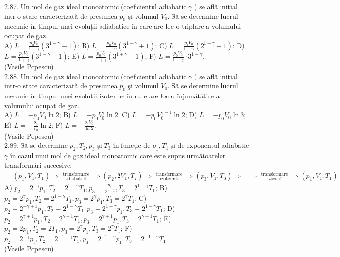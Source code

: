 2.87. Un mol de gaz ideal monoatomic (coeficientul adiabatic $\gamma$ ) se află inițial intr-o stare caracterizată de presiunea $p_{0}$ şi volumul $V_{0}$. Să se determine lucrul mecanic în timpul unei evoluții adiabatice în care are loc o triplare a volumului ocupat de gaz.\\ A) $L=\frac{p_{0} V_{0}}{1-\gamma}\left(3^{1-\gamma}-1\right)$; B) $L=\frac{p_{0} V_{0}}{1-\gamma}\left(3^{1-\gamma}+1\right)$; C) $L=\frac{p_{0} V_{0}}{1-\gamma}\left(2^{1-\gamma}-1\right)$; D) $L=\frac{p_{0} V_{0}}{1+\gamma}\left(3^{1-\gamma}-1\right)$; E) $L=\frac{p_{0} V_{0}}{1+\gamma}\left(3^{1+\gamma}-1\right)$; F) $L=\frac{p_{0} V_{0}}{1-\gamma} \cdot 3^{1-\gamma}$.\\ (Vasile Popescu)\\

2.88. Un mol de gaz ideal monoatomic (coeficientul adiabatic $\gamma$ ) se află inițial intr-o stare caracterizată de presiunea $p_{0}$ şi volumul $V_{0}$. Să se determine lucrul mecanic în timpul unei evoluții izoterme în care are loc o înjumătățire a volumului ocupat de gaz.\\ A) $L=-p_{0} V_{0} \ln 2$; B) $L=-p_{0} V_{0}^{\gamma} \ln 2$; C) $L=-p_{0} V_{0}^{\gamma-1} \ln 2$; D) $L=-p_{0} V_{0} \ln 3$; E) $L=-\frac{p_{0}}{V_{0}} \ln 2$; F) $L=-\frac{p_{0} V_{0}}{\ln 2}$.\\ (Vasile Popescu)\\

2.89. Să se determine $p_{2}, T_{2}, p_{3}$ și $T_{3}$ în funcție de $p_{1}, T_{1}$ și de exponentul adiabatic $\gamma$ în cazul unui mol de gaz ideal monoatomic care este supus următoarelor transformări succesive: $\begin{aligned}& \left(p_{1}, V_{1}, T_{1}\right) \Rightarrow \frac{\text { transformare }}{\text { adiabatică }} \Rightarrow\left(p_{2}, 2 V_{1}, T_{2}\right) \Rightarrow \frac{\text { transformare }}{\text { izotermă }} \Rightarrow\left(p_{3}, V_{1}, T_{3}\right) \Rightarrow & \Rightarrow \frac{\text { transformare }}{\text { izocoră }} \Rightarrow\left(p_{1}, V_{1}, T_{1}\right) \end{aligned}$\\ A) $p_{2}=2^{-\gamma} p_{1}, T_{2}=2^{1-\gamma} T_{1}, p_{3}=\frac{p_{1}}{2^{\gamma-1}}, T_{3}=2^{1-\gamma} T_{1}$; B) $p_{2}=2^{\gamma} p_{1}, T_{2}=2^{1-\gamma} T_{1}, p_{3}=2^{\gamma} p_{1}, T_{3}=2^{\gamma} T_{1}$; C) $p_{2}=2^{-\gamma+1} p_{1}, T_{2}=2^{1-\gamma} T_{1}, p_{3}=2^{1-\gamma} p_{1}, T_{3}=2^{1-\gamma} T_{1}$; D) $p_{2}=2^{\gamma+1} p_{1}, T_{2}=2^{\gamma+1} T_{1}, p_{3}=2^{\gamma+1} p_{1}, T_{3}=2^{\gamma+1} T_{1}$; E) $p_{2}=2 p_{1}, T_{2}=2 T_{1}, p_{3}=2^{\gamma} p_{1}, T_{3}=2^{\gamma} T_{1}$; F) $p_{2}=2^{-\gamma} p_{1}, T_{2}=2^{-1-\gamma} T_{1}, p_{3}=2^{-1-\gamma} p_{1}, T_{3}=2^{-1-\gamma} T_{1}$.\\ (Vasile Popescu)\\

